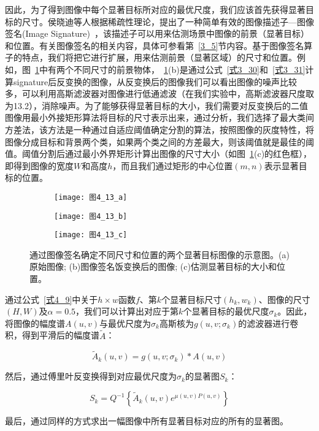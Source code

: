 因此，为了得到图像中每个显著目标所对应的最优尺度，我们应该首先获得显著目标的尺寸。侯晓迪等人根据稀疏性理论，提出了一种简单有效的图像描述子---图像签名(Image Signature)~\cite{HouXiaodiTPAMI2012Signature}，该描述子可以用来估测场景中图像的前景（显著目标）和位置。有关图像签名的相关内容，具体可参看第~\ref{3_5}节内容。基于图像签名算子的特点，我们将把它进行扩展，用来估测前景（显著区域）的尺寸和位置。例如，图~\ref{图4_13}中有两个不同尺寸的前景物体，~\ref{图4_13}(b)是通过公式~\ref{式3_30}和~\ref{式3_31}计算signature后反变换的图像，从反变换后的图像我们可以看出图像的噪声比较多，可以利用高斯滤波器对图像进行低通滤波（在我们实验中，高斯滤波器尺度取为13.2），消除噪声。为了能够获得显著目标的大小，我们需要对反变换后的二值图像用最小外接矩形算法将目标的尺寸表示出来，通过分析，我们选择了最大类间方差法，该方法是一种通过自适应阈值确定分割的算法，按照图像的灰度特性，将图像分成目标和背景两个类，如果两个类之间的方差最大，则该阈值就是最佳的阈值。阈值分割后通过最小外界矩形计算出图像的尺寸大小（如图~\ref{图4_13}(c)的红色框），即得到图像的宽度$W$和高度$h$，而且我们通过矩形的中心位置$(m,n)$表示显著目标的位置。
\begin{figure}[h]
  \centering%
  \begin{subfigure}{3cm}
    \texttt{[image: 图4\_13\_a]}
    \caption{}
  \end{subfigure}
  \hspace{4em}%
  \begin{subfigure}{0.2\textwidth}
    \texttt{[image: 图4\_13\_b]}
    \caption{}
  \end{subfigure}
  \hspace{4em}%
  \begin{subfigure}{0.25\textwidth}
    \texttt{[image: 图4\_13\_c]}
    \caption{}
  \end{subfigure}
  \caption{通过图像签名确定不同尺寸和位置的两个显著目标图像的示意图。(a)原始图像; (b)图像签名饭变换后的图像; (c)估测显著目标的大小和位置。}
  \label{图4_13}
\end{figure}

通过公式~\ref{式4_9}中关于$h×w$函数$f$、第$k$个显著目标尺寸$(h_{k},w_{k})$、图像的尺寸$(H,W)$及$\alpha=0.5$，我们可以计算出对应于第$k$个显著目标的最优尺度$\sigma_{k}$。因此，将图像的幅度谱$A(u,v)$与最优尺度为$\sigma_{k}$高斯核为$g(u,v;\sigma_{k})$的滤波器进行卷积，得到平滑后的幅度谱$\tilde{A}$： 
\begin{linenomath}
\begin{equation}
\tilde{A}_k(u,v)=g(u,v;\sigma_k)\ast A(u,v)
\label{式4_25}
\end{equation}
\end{linenomath}
然后，通过傅里叶反变换得到对应最优尺度为$\sigma_{k}$的显著图$S_{k}$：
\begin{linenomath}
\begin{equation}
S_k=Q^{-1}\left\{\tilde{A}_k(u,v)e^{\mu(u,v)P(u,v)}\right\}
\label{式4_26}
\end{equation}
\end{linenomath}
最后，通过同样的方式求出一幅图像中所有显著目标对应的所有的显著图。

